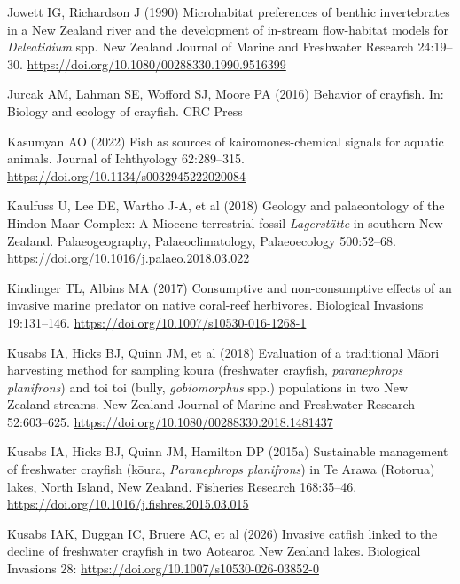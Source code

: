 \documentclass[
  12pt,
  a4paper,
]{scrbook}
\newlength{\cslhangindent}
\newenvironment{CSLReferences}[2] %
 {\begin{list}{}{%
  \setlength{\itemindent}{0pt}
  \setlength{\leftmargin}{0pt}
  \setlength{\parsep}{0pt}
  \ifodd #1
   \setlength{\leftmargin}{\cslhangindent}
   \setlength{\itemindent}{-1\cslhangindent}
  \fi
  \setlength{\itemsep}{#2\baselineskip}}}
 {\end{list}}
\begin{document}
\begin{CSLReferences}{1}{1}
Jowett IG, Richardson J (1990) Microhabitat preferences of benthic
invertebrates in a {New Zealand} river and the development of in-stream
flow-habitat models for {\emph{Deleatidium}} spp. New Zealand Journal of
Marine and Freshwater Research 24:19--30.
\url{https://doi.org/10.1080/00288330.1990.9516399}

Jurcak AM, Lahman SE, Wofford SJ, Moore PA (2016) Behavior of crayfish.
In: Biology and ecology of crayfish. CRC Press

Kasumyan AO (2022) Fish as sources of kairomones-chemical signals for
aquatic animals. Journal of Ichthyology 62:289--315.
\url{https://doi.org/10.1134/s0032945222020084}

Kaulfuss U, Lee DE, Wartho J-A, et al (2018) Geology and palaeontology
of the {Hindon Maar Complex}: A {Miocene} terrestrial fossil
{\emph{Lagerstätte}} in southern {New Zealand}. Palaeogeography,
Palaeoclimatology, Palaeoecology 500:52--68.
\url{https://doi.org/10.1016/j.palaeo.2018.03.022}

Kindinger TL, Albins MA (2017) Consumptive and non-consumptive effects
of an invasive marine predator on native coral-reef herbivores.
Biological Invasions 19:131--146.
\url{https://doi.org/10.1007/s10530-016-1268-1}

Kusabs IA, Hicks BJ, Quinn JM, et al (2018) Evaluation of a traditional
{Māori} harvesting method for sampling kōura (freshwater crayfish,
\emph{paranephrops planifrons}) and toi toi (bully, \emph{gobiomorphus}
spp.) populations in two {New Zealand} streams. New Zealand Journal of
Marine and Freshwater Research 52:603--625.
\url{https://doi.org/10.1080/00288330.2018.1481437}

Kusabs IA, Hicks BJ, Quinn JM, Hamilton DP (2015a) Sustainable
management of freshwater crayfish (kōura, {\emph{Paranephrops
planifrons}}) in {Te Arawa} ({Rotorua}) lakes, {North Island}, {New
Zealand}. Fisheries Research 168:35--46.
\url{https://doi.org/10.1016/j.fishres.2015.03.015}

Kusabs IAK, Duggan IC, Bruere AC, et al (2026) Invasive catfish linked
to the decline of freshwater crayfish in two {Aotearoa New Zealand}
lakes. Biological Invasions 28:
\url{https://doi.org/10.1007/s10530-026-03852-0}


\end{CSLReferences}
\end{document}
